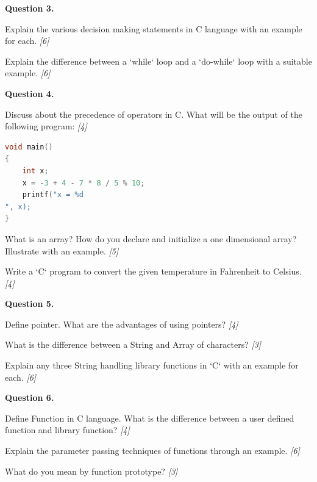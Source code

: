 \documentclass[11pt,a4paper]{article}
\newcommand{\pts}[1]{\hfill   \textit{[#1]}}
\begin{document}
\medskip


\noindent   \textbf{Question 3.}

\begin{parts}
  \item Explain the various decision making statements in C language with an example for each. \pts{6}
  \item Explain the difference between a `while` loop and a `do-while` loop with a suitable example. \pts{6}
\end{parts}

\medskip


\noindent   \textbf{Question 4.}

\begin{parts}
  \item Discuss about the precedence of operators in C. What will be the output of the following program: \pts{4}

\begin{lstlisting}[language=C]
void main()
{
    int x;
    x = -3 + 4 - 7 * 8 / 5 % 10;
    printf("x = %d
", x);
}
\end{lstlisting}
  \item What is an array? How do you declare and initialize a one dimensional array? Illustrate with an example. \pts{5}
  \item Write a `C` program to convert the given temperature in Fahrenheit to Celsius. \pts{4}
\end{parts}

\medskip


\noindent   \textbf{Question 5.}

\begin{parts}
  \item Define pointer. What are the advantages of using pointers? \pts{4}
  \item What is the difference between a String and Array of characters? \pts{3}
  \item Explain any three String handling library functions in `C` with an example for each. \pts{6}
\end{parts}

\medskip


\noindent   \textbf{Question 6.}

\begin{parts}
  \item Define Function in C language. What is the difference between a user defined function and library function? \pts{4}
  \item Explain the parameter passing techniques of functions through an example. \pts{6}
  \item What do you mean by function prototype? \pts{3}
\end{parts}
\end{document}
